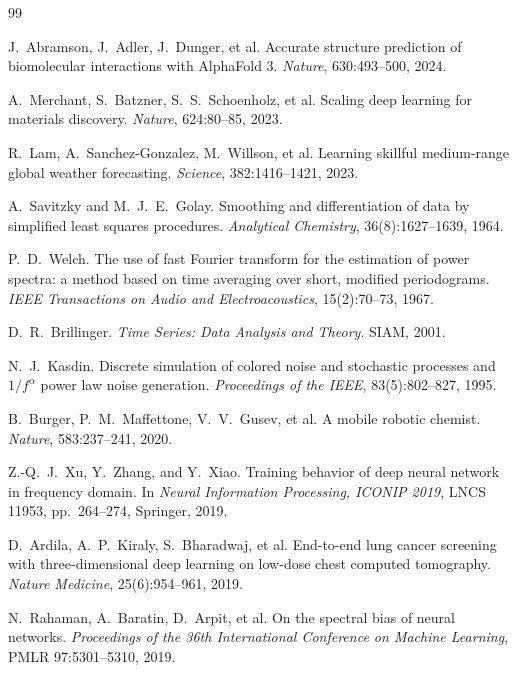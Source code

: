 \documentclass[9pt,twocolumn]{article}
\theoremstyle{remark}
\theoremstyle{definition}
\begin{document}
\begin{thebibliography}{99}

J.~Abramson, J.~Adler, J.~Dunger, et al.
\newblock Accurate structure prediction of biomolecular interactions with AlphaFold 3.
\newblock \textit{Nature}, 630:493--500, 2024.

A.~Merchant, S.~Batzner, S.~S.~Schoenholz, et al.
\newblock Scaling deep learning for materials discovery.
\newblock \textit{Nature}, 624:80--85, 2023.

R.~Lam, A.~Sanchez-Gonzalez, M.~Willson, et al.
\newblock Learning skillful medium-range global weather forecasting.
\newblock \textit{Science}, 382:1416--1421, 2023.

A.~Savitzky and M.~J.~E.~Golay.
\newblock Smoothing and differentiation of data by simplified least squares procedures.
\newblock \textit{Analytical Chemistry}, 36(8):1627--1639, 1964.

P.~D.~Welch.
\newblock The use of fast Fourier transform for the estimation of power spectra: a method based on time averaging over short, modified periodograms.
\newblock \textit{IEEE Transactions on Audio and Electroacoustics}, 15(2):70--73, 1967.

D.~R.~Brillinger.
\newblock \textit{Time Series: Data Analysis and Theory}. SIAM, 2001.

N.~J.~Kasdin.
\newblock Discrete simulation of colored noise and stochastic processes and $1/f^\alpha$ power law noise generation.
\newblock \textit{Proceedings of the IEEE}, 83(5):802--827, 1995.

B.~Burger, P.~M.~Maffettone, V.~V.~Gusev, et al.
\newblock A mobile robotic chemist.
\newblock \textit{Nature}, 583:237--241, 2020.

Z.-Q.~J.~Xu, Y.~Zhang, and Y.~Xiao.
\newblock Training behavior of deep neural network in frequency domain.
\newblock In \textit{Neural Information Processing, ICONIP 2019}, LNCS 11953, pp.~264--274, Springer, 2019.

D.~Ardila, A.~P.~Kiraly, S.~Bharadwaj, et al.
\newblock End-to-end lung cancer screening with three-dimensional deep learning on low-dose chest computed tomography.
\newblock \textit{Nature Medicine}, 25(6):954--961, 2019.

N.~Rahaman, A.~Baratin, D.~Arpit, et al.
\newblock On the spectral bias of neural networks.
\newblock \textit{Proceedings of the 36th International Conference on Machine Learning}, PMLR 97:5301--5310, 2019.


\end{thebibliography}
\end{document}
